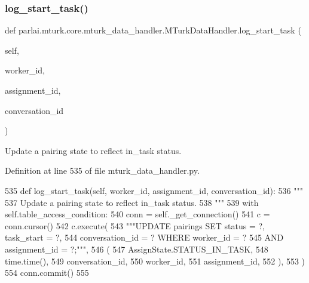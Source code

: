 \subsubsection{\texorpdfstring{log\+\_\+start\+\_\+task()}{log\_start\_task()}}
{\footnotesize\ttfamily def parlai.\+mturk.\+core.\+mturk\+\_\+data\+\_\+handler.\+M\+Turk\+Data\+Handler.\+log\+\_\+start\+\_\+task (\begin{DoxyParamCaption}\item[{}]{self,  }\item[{}]{worker\+\_\+id,  }\item[{}]{assignment\+\_\+id,  }\item[{}]{conversation\+\_\+id }\end{DoxyParamCaption})}

\begin{DoxyVerb}Update a pairing state to reflect in_task status.
\end{DoxyVerb}
 

Definition at line 535 of file mturk\+\_\+data\+\_\+handler.\+py.


\begin{DoxyCode}
535     \textcolor{keyword}{def }log\_start\_task(self, worker\_id, assignment\_id, conversation\_id):
536         \textcolor{stringliteral}{"""}
537 \textcolor{stringliteral}{        Update a pairing state to reflect in\_task status.}
538 \textcolor{stringliteral}{        """}
539         with self.table\_access\_condition:
540             conn = self.\_get\_connection()
541             c = conn.cursor()
542             c.execute(
543                 \textcolor{stringliteral}{"""UPDATE pairings SET status = ?, task\_start = ?,}
544 \textcolor{stringliteral}{                         conversation\_id = ? WHERE worker\_id = ?}
545 \textcolor{stringliteral}{                         AND assignment\_id = ?;"""},
546                 (
547                     AssignState.STATUS\_IN\_TASK,
548                     time.time(),
549                     conversation\_id,
550                     worker\_id,
551                     assignment\_id,
552                 ),
553             )
554             conn.commit()
555 
\end{DoxyCode}
\mbox{\label{classparlai_1_1mturk_1_1core_1_1mturk__data__handler_1_1MTurkDataHandler_a2cebff3c6da14d643bd2bfedce73ba4a}} 
